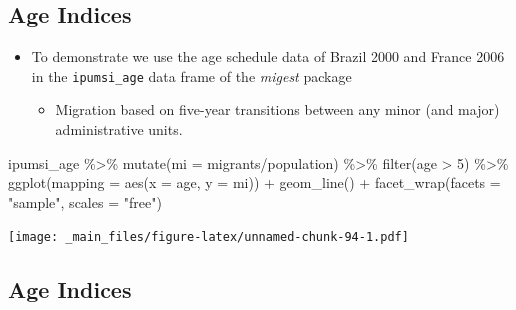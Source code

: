\documentclass[
]{book}
\newenvironment{Shaded}{\begin{snugshade}}{\end{snugshade}}
\newcommand{\AttributeTok}[1]{\textcolor[rgb]{0.77,0.63,0.00}{#1}}
\newcommand{\DecValTok}[1]{\textcolor[rgb]{0.00,0.00,0.81}{#1}}
\newcommand{\FunctionTok}[1]{\textcolor[rgb]{0.00,0.00,0.00}{#1}}
\newcommand{\NormalTok}[1]{#1}
\newcommand{\SpecialCharTok}[1]{\textcolor[rgb]{0.00,0.00,0.00}{#1}}
\newcommand{\StringTok}[1]{\textcolor[rgb]{0.31,0.60,0.02}{#1}}
\providecommand{\tightlist}{%
  \setlength{\itemsep}{0pt}\setlength{\parskip}{0pt}}
\begin{document}
\hypertarget{age-indices-4}{%
\subsection{Age Indices}\label{age-indices-4}}

\begin{itemize}
\tightlist
\item
  To demonstrate we use the age schedule data of Brazil 2000 and France 2006 in the \texttt{ipumsi\_age} data frame of the \emph{migest} package

  \begin{itemize}
  \tightlist
  \item
    Migration based on five-year transitions between any minor (and major) administrative units.
  \end{itemize}
\end{itemize}

\begin{Shaded}
\begin{Highlighting}[]
\NormalTok{ipumsi\_age }\SpecialCharTok{\%\textgreater{}\%}
  \FunctionTok{mutate}\NormalTok{(}\AttributeTok{mi =}\NormalTok{ migrants}\SpecialCharTok{/}\NormalTok{population) }\SpecialCharTok{\%\textgreater{}\%}
  \FunctionTok{filter}\NormalTok{(age }\SpecialCharTok{\textgreater{}} \DecValTok{5}\NormalTok{) }\SpecialCharTok{\%\textgreater{}\%}
  \FunctionTok{ggplot}\NormalTok{(}\AttributeTok{mapping =} \FunctionTok{aes}\NormalTok{(}\AttributeTok{x =}\NormalTok{ age, }\AttributeTok{y =}\NormalTok{ mi)) }\SpecialCharTok{+}
  \FunctionTok{geom\_line}\NormalTok{() }\SpecialCharTok{+}
  \FunctionTok{facet\_wrap}\NormalTok{(}\AttributeTok{facets =} \StringTok{"sample"}\NormalTok{, }\AttributeTok{scales =} \StringTok{"free"}\NormalTok{)}
\end{Highlighting}
\end{Shaded}

\texttt{[image: \_main\_files/figure-latex/unnamed-chunk-94-1.pdf]}

\hypertarget{age-indices-5}{%
\subsection{Age Indices}\label{age-indices-5}}
\end{document}
